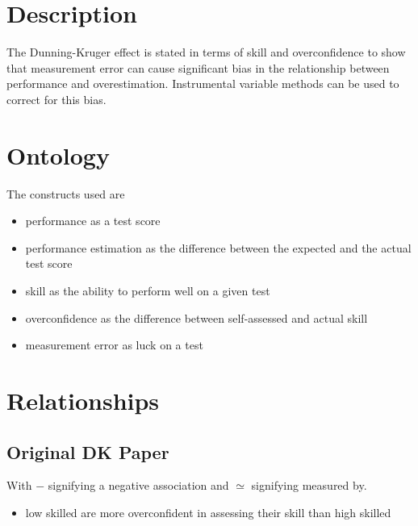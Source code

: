 \documentclass[a4paper,11pt]{article}
\newcommand{\1}{\mathbf{1}}
\begin{document}
\section{Description}
The Dunning-Kruger effect is stated in terms of skill and overconfidence to show that measurement error can cause significant bias in the relationship between performance and overestimation.
Instrumental variable methods can be used to correct for this bias.

\section{Ontology}
The constructs used are
\begin{itemize}
 \item performance as a test score
 \item performance estimation as the difference between the expected and the actual test score
 \item skill as the ability to perform well on a given test
 \item overconfidence as the difference between self-assessed and actual skill
 \item measurement error as luck on a test
\end{itemize}

\section{Relationships}

\subsection{Original DK Paper}

\begin{figure}[H]
  \vspace{1cm}
  \begin{center}
  
  \end{center}
  \label{fig:typetree}
\end{figure}

With $-$ signifying a negative association and $\simeq$ signifying measured by.

\begin{itemize}
 \item low skilled are more overconfident in assessing their skill than high skilled
\end{itemize}
\end{document}
